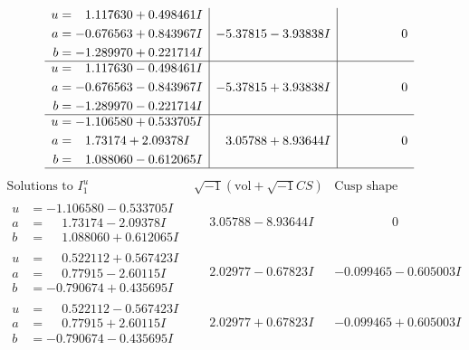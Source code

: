 \documentclass[1p]{elsarticle_modified}
\theoremstyle{definition}
\newcommand{\I}{\sqrt{-1}}
\begin{document}
$$\begin{array}{c|c|c}
\begin{aligned}
u &= \phantom{-}1.117630 + 0.498461 I \\
a &= -0.676563 + 0.843967 I \\
b &= -1.289970 + 0.221714 I\end{aligned}
 & -5.37815 - 3.93838 I & \phantom{-0.000000 } 0 \\ \hline\begin{aligned}
u &= \phantom{-}1.117630 - 0.498461 I \\
a &= -0.676563 - 0.843967 I \\
b &= -1.289970 - 0.221714 I\end{aligned}
 & -5.37815 + 3.93838 I & \phantom{-0.000000 } 0 \\ \hline\begin{aligned}
u &= -1.106580 + 0.533705 I \\
a &= \phantom{-}1.73174 + 2.09378 I \\
b &= \phantom{-}1.088060 - 0.612065 I\end{aligned}
 & \phantom{-}3.05788 + 8.93644 I & \phantom{-0.000000 } 0\\
 \hline 
 \end{array}$$\newpage$$\begin{array}{c|c|c}  
\text{Solutions to }I^u_{1}& \I (\text{vol} + \sqrt{-1}CS) & \text{Cusp shape}\\
 \hline 
\begin{aligned}
u &= -1.106580 - 0.533705 I \\
a &= \phantom{-}1.73174 - 2.09378 I \\
b &= \phantom{-}1.088060 + 0.612065 I\end{aligned}
 & \phantom{-}3.05788 - 8.93644 I & \phantom{-0.000000 } 0 \\ \hline\begin{aligned}
u &= \phantom{-}0.522112 + 0.567423 I \\
a &= \phantom{-}0.77915 - 2.60115 I \\
b &= -0.790674 + 0.435695 I\end{aligned}
 & \phantom{-}2.02977 - 0.67823 I & -0.099465 - 0.605003 I \\ \hline\begin{aligned}
u &= \phantom{-}0.522112 - 0.567423 I \\
a &= \phantom{-}0.77915 + 2.60115 I \\
b &= -0.790674 - 0.435695 I\end{aligned}
 & \phantom{-}2.02977 + 0.67823 I & -0.099465 + 0.605003 I \\ \hline\begin{aligned}

\end{aligned}
\end{array}$$
\end{document}

